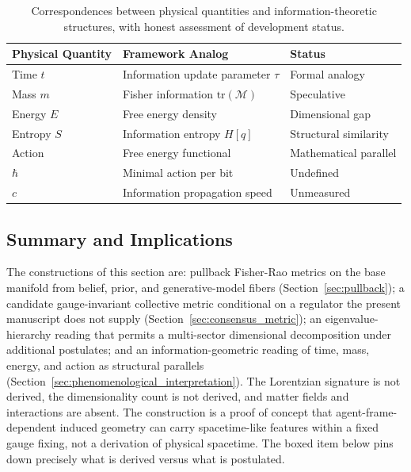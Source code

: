 \documentclass[11pt]{article}
\begin{document}
\begin{table}[h]
\centering
\begin{tabular}{|l|l|l|}
\hline
\textbf{Physical Quantity} & \textbf{Framework Analog} & \textbf{Status} \\
\hline
Time $t$ & Information update parameter $\tau$ & Formal analogy \\
Mass $m$ & Fisher information $\mathrm{tr}(\mathcal{M})$ & Speculative \\
Energy $E$ & Free energy density & Dimensional gap \\
Entropy $S$ & Information entropy $H[q]$ & Structural similarity \\
Action & Free energy functional & Mathematical parallel \\
$\hbar$ & Minimal action per bit & Undefined \\
$c$ & Information propagation speed & Unmeasured \\
\hline
\end{tabular}
\caption{Correspondences between physical quantities and information-theoretic structures, with honest assessment of development status.}
\label{tab:physical_correspondences}
\end{table}

\subsection{Summary and Implications}

The constructions of this section are: pullback Fisher-Rao metrics on the base manifold from belief, prior, and generative-model fibers (Section~\ref{sec:pullback}); a candidate gauge-invariant collective metric conditional on a regulator the present manuscript does not supply (Section~\ref{sec:consensus_metric}); an eigenvalue-hierarchy reading that permits a multi-sector dimensional decomposition under additional postulates; and an information-geometric reading of time, mass, energy, and action as structural parallels (Section~\ref{sec:phenomenological_interpretation}). The Lorentzian signature is not derived, the dimensionality count is not derived, and matter fields and interactions are absent. The construction is a proof of concept that agent-frame-dependent induced geometry can carry spacetime-like features within a fixed gauge fixing, not a derivation of physical spacetime. The boxed item below pins down precisely what is derived versus what is postulated.
\end{document}
